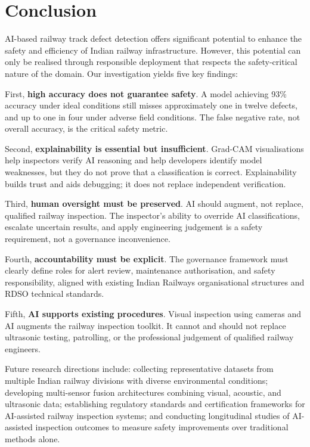 \documentclass[conference]{IEEE}
\begin{document}
\section{Conclusion}
\label{sec:conclusion}

AI-based railway track defect detection offers significant potential to enhance the safety and efficiency of Indian railway infrastructure. However, this potential can only be realised through responsible deployment that respects the safety-critical nature of the domain. Our investigation yields five key findings:

First, \textbf{high accuracy does not guarantee safety}. A model achieving 93\% accuracy under ideal conditions still misses approximately one in twelve defects, and up to one in four under adverse field conditions. The false negative rate, not overall accuracy, is the critical safety metric.

Second, \textbf{explainability is essential but insufficient}. Grad-CAM visualisations help inspectors verify AI reasoning and help developers identify model weaknesses, but they do not prove that a classification is correct. Explainability builds trust and aids debugging; it does not replace independent verification.

Third, \textbf{human oversight must be preserved}. AI should augment, not replace, qualified railway inspection. The inspector's ability to override AI classifications, escalate uncertain results, and apply engineering judgement is a safety requirement, not a governance inconvenience.

Fourth, \textbf{accountability must be explicit}. The governance framework must clearly define roles for alert review, maintenance authorisation, and safety responsibility, aligned with existing Indian Railways organisational structures and RDSO technical standards.

Fifth, \textbf{AI supports existing procedures}. Visual inspection using cameras and AI augments the railway inspection toolkit. It cannot and should not replace ultrasonic testing, patrolling, or the professional judgement of qualified railway engineers.

Future research directions include: collecting representative datasets from multiple Indian railway divisions with diverse environmental conditions; developing multi-sensor fusion architectures combining visual, acoustic, and ultrasonic data; establishing regulatory standards and certification frameworks for AI-assisted railway inspection systems; and conducting longitudinal studies of AI-assisted inspection outcomes to measure safety improvements over traditional methods alone.
\end{document}

